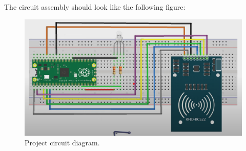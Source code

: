 \documentclass{article}
\begin{document}
The circuit assembly should look like the following figure:
\begin{figure}[H]
	\centering
	\includegraphics[width=1\linewidth]{../images/esquema_de_conexionado.png}
	\caption{\label{fig:circuito}Project circuit diagram.}
\end{figure}
\end{document}
